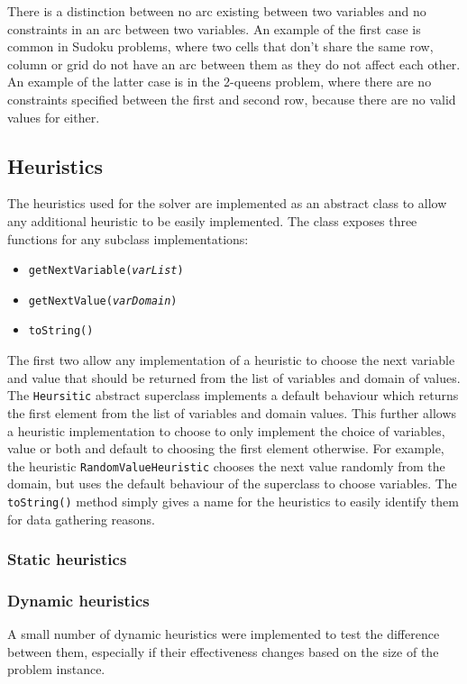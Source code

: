 \documentclass{article}
\begin{document}
There is a distinction between no arc existing between two variables and no constraints in an arc between two variables. An example of the first case is common in Sudoku problems, where two cells that don't share the same row, column or grid do not have an arc between them as they do not affect each other. An example of the latter case is in the 2-queens problem, where there are no constraints specified between the first and second row, because there are no valid values for either. 

\subsection{Heuristics}\label{sec:heuristics}
The heuristics used for the solver are implemented as an abstract class to allow any additional heuristic to be easily implemented. The class exposes three functions for any subclass implementations:
\begin{itemize}
\item \texttt{getNextVariable(\textit{varList})}
\item \texttt{getNextValue(\textit{varDomain})}
\item \texttt{toString()}
\end{itemize}
The first two allow any implementation of a heuristic to choose the next variable and value that should be returned from the list of variables and domain of values. The \texttt{Heursitic} abstract superclass implements a default behaviour which returns the first element from the list of variables and domain values. This further allows a heuristic implementation to choose to only implement the choice of variables, value or both and default to choosing the first element otherwise. For example, the heuristic \texttt{RandomValueHeuristic} chooses the next value randomly from the domain, but uses the default behaviour of the superclass to choose variables. 
\n
The \texttt{toString()} method simply gives a name for the heuristics to easily identify them for data gathering reasons. 

\subsubsection{Static heuristics}

\subsubsection{Dynamic heuristics}
A small number of dynamic heuristics were implemented to test the difference between them, especially if their effectiveness changes based on the size of the problem instance. 
\end{document}
